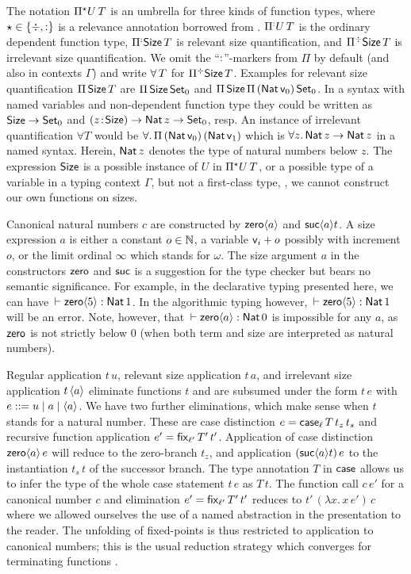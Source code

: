 \documentclass[acmsmall%
]{acmart}\settopmatter{printfolios=true}
\begin{document}
The notation $\epiT U T$ is an
umbrella for three kinds of function types, where
$\evar \in \{ \erased, \noterased \}$ is a relevance annotation
borrowed from \citet{pfenning:lics01}. $\erpiT[\noterased] U T$ is
the ordinary dependent function type, $\erpiT[\noterased] \Size T$ is
relevant size quantification, and $\erpiT \Size T$ is irrelevant size
quantification.  We omit the ``$\noterased$''-markers
from $\Pi$ by default (and also in contexts $\Gamma$)
and write $\forallT T$ for $\erpiT \Size T$.
%
Examples for relevant size quantification $\piT \Size T$ are
$\piT \Size {\Set[0]}$ and
$\piT \Size {\piT {(\Nat{\ind 0})} {\Set[0]}}$.
In a syntax with named variables and non-dependent function type
they could be written as $\Size \to \Set[0]$ and
$\funT z \Size \Nat z \to \Set[0]$, resp.
%
An instance of irrelevant
quantification $\forall T$ would be
$\forall.\, \piT {(\Nat{\ind 0})} {(\Nat{\ind 1})}$
which is
$\forall z.\, \Nat z \to \Nat z$
in a named syntax.
Herein, $\Nat z$ denotes the type of natural numbers below $z$. The
expression $\Size$ is a possible instance of $U$ in $\epiT U T$, or a
possible type of a variable in a typing context $\Gamma$, but not a
first-class type, \ie, we cannot construct our own functions on sizes.

Canonical natural numbers $c$ are constructed by $\zero a$ and $\suc a t$.
A size expression $a$ is either a constant $o \in \NN$, a variable
$\ind i + o$ possibly with increment $o$, or the limit ordinal
$\infty$ which stands for $\omega$.  The size argument $a$ in the
constructors $\tzero$ and $\tsuc$
is a suggestion for the type checker but bears no
semantic significance.  For example, in the declarative typing
presented here, we can have $\der \zero 5 : \Nat 1$.
In the algorithmic typing however, $\der \zero 5 \jchk \Nat 1$ will be an error.
Note, however, that $\der \zero a : \Nat 0$ is impossible for any $a$,
as $\tzero$ is not strictly below $0$
(when both term and size are interpreted as natural numbers).

Regular application $t\,u$, relevant size application
$t\,a$, and irrelevant size application $t \, \ann a$ eliminate
functions $t$ and are subsumed under the form $t\,e$ with $e ::= u \mid a \mid \ann a$.
We have two further eliminations, which make sense when $t$ stands for a natural number.
These are case distinction
$e = \case[\ell] T {t_z}{t_s}$ and recursive function application
$e' = \fix[\ell'] {T'} {t'}$.
Application of case distinction $\zero a \, e$ will
reduce to the zero-branch $t_z$, and application $(\suc a t) \,e$ to the
instantiation $t_s\,t$ of the successor branch.  The type annotation
$T$ in $\tcase$ allows us to infer the type of the whole case
statement $t\,e$ as $T\,t$.  The function call $c\,e'$ for a canonical
number $c$ and elimination $e' = \fix[\ell'] {T'} {t'}$
reduces to $t'\,(\lambda x.\,x\,e')\,c$ where we allowed
ourselves the use of a named abstraction in the presentation to the
reader.  The unfolding of fixed-points is thus restricted to
application to canonical numbers; this is the usual reduction strategy
which converges for terminating functions \cite{gimenez:typeBased}.
\end{document}
